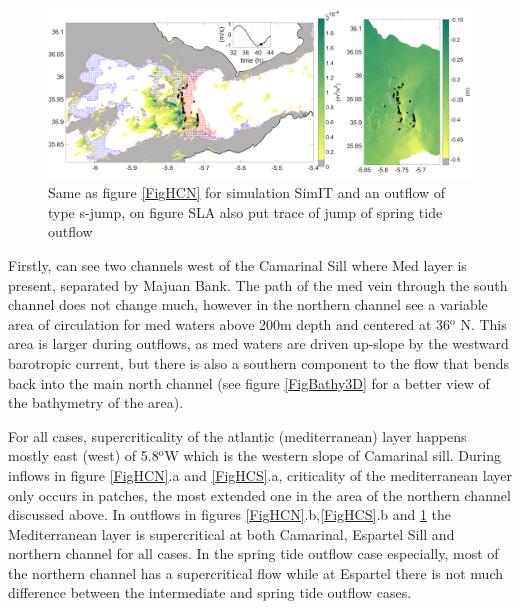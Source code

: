 \begin{figure}[!h]
 \centering
\includegraphics[width=\linewidth]{./GBR3D/IES_41h_p.png}
 \caption {Same as figure  \ref{FigHCN} for simulation SimIT and an outflow of type {s-jump}, on figure SLA also put trace of jump of spring tide outflow}
 \label{FigHCI}
\end{figure}

Firstly, can see two channels west of the Camarinal Sill where Med layer is present, separated by Majuan Bank. The path of the med vein through the south channel does not change much, however in the northern channel see a variable area of circulation for med waters above 200m depth and centered at 36$^\text{o}$ N. This area is larger during outflows, as med waters are driven up-slope by the westward barotropic current, but there is also a southern component to the flow that bends back into the main north channel (see figure \ref{FigBathy3D} for a better view of the bathymetry of the area).

For all cases, supercriticality of the atlantic (mediterranean) layer happens mostly east (west) of 5.8$^\text{o}$W which is the western slope of Camarinal sill. During inflows in figure \ref{FigHCN}.a and \ref{FigHCS}.a, criticality of the mediterranean layer only occurs in patches, the most extended one in the area of the northern channel discussed above. In outflows in figures \ref{FigHCN}.b,\ref{FigHCS}.b and \ref{FigHCI} the Mediterranean layer is supercritical at both Camarinal, Espartel Sill and northern channel for all cases. In the spring tide outflow case especially, most of the northern channel has a supercritical flow while at Espartel there is not much difference between the intermediate and spring tide outflow cases.


